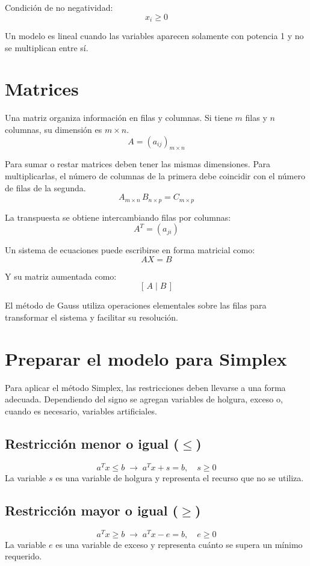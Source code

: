 \documentclass[12pt,letterpaper]{article}
\begin{document}
Condición de no negatividad:
\[ x_i \geq 0 \]

Un modelo es lineal cuando las variables aparecen solamente con potencia 1 y no se multiplican entre sí.

\section*{Matrices}

Una matriz organiza información en filas y columnas. Si tiene $m$ filas y $n$ columnas, su dimensión es $m \times n$.
\[ A = (a_{ij})_{m\times n} \]

Para sumar o restar matrices deben tener las mismas dimensiones. Para multiplicarlas, el número de columnas de la primera debe coincidir con el número de filas de la segunda.
\[ A_{m\times n}\, B_{n\times p} = C_{m\times p} \]

La transpuesta se obtiene intercambiando filas por columnas:
\[ A^{T} = (a_{ji}) \]

Un sistema de ecuaciones puede escribirse en forma matricial como:
\[ AX = B \]

Y su matriz aumentada como:
\[ [\,A \mid B\,] \]

El método de Gauss utiliza operaciones elementales sobre las filas para transformar el sistema y facilitar su resolución.

\section*{Preparar el modelo para Simplex}

Para aplicar el método Simplex, las restricciones deben llevarse a una forma adecuada. Dependiendo del signo se agregan variables de holgura, exceso o, cuando es necesario, variables artificiales.

\subsection*{Restricción menor o igual ($\leq$)}
\[ a^{T}x \leq b \;\rightarrow\; a^{T}x + s = b, \quad s \geq 0 \]
La variable $s$ es una variable de holgura y representa el recurso que no se utiliza.

\subsection*{Restricción mayor o igual ($\geq$)}
\[ a^{T}x \geq b \;\rightarrow\; a^{T}x - e = b, \quad e \geq 0 \]
La variable $e$ es una variable de exceso y representa cuánto se supera un mínimo requerido.
\end{document}
